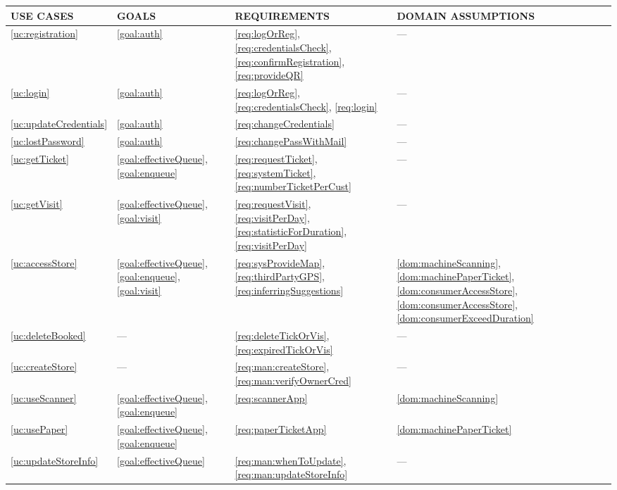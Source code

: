 \documentclass[a4paper, 12pt, oneside]{article}
\begin{document}
\begin{tabularx}{\linewidth}{| p{20mm} | p{20mm} | p{35mm} | p{50mm} |}

     \hline
    USE CASES & GOALS & REQUIREMENTS & DOMAIN ASSUMPTIONS \\
     \hline
    \ref{uc:registration} & \ref{goal:auth} & \ref{req:logOrReg}, \ref{req:credentialsCheck}, \ref{req:confirmRegistration}, \ref{req:provideQR}  & ---\\
    
     \hline
    \ref{uc:login} & \ref{goal:auth} & \ref{req:logOrReg}, \ref{req:credentialsCheck}, \ref{req:login} & --- \\
    
    \hline
    \ref{uc:updateCredentials} & \ref{goal:auth} & \ref{req:changeCredentials} & --- \\

    \hline
    \ref{uc:lostPassword} & \ref{goal:auth} & \ref{req:changePassWithMail} & --- \\
    
    \hline
    \ref{uc:getTicket} & \ref{goal:effectiveQueue}, \ref{goal:enqueue} & \ref{req:requestTicket}, \ref{req:systemTicket}, \ref{req:numberTicketPerCust} & --- \\
    \hline
    
    \ref{uc:getVisit} & \ref{goal:effectiveQueue}, \ref{goal:visit} & \ref{req:requestVisit}, \ref{req:visitPerDay}, \ref{req:statisticForDuration}, \ref{req:visitPerDay} & --- \\
    \hline
    
    \ref{uc:accessStore} & \ref{goal:effectiveQueue}, \ref{goal:enqueue}, \ref{goal:visit} & \ref{req:sysProvideMap}, \ref{req:thirdPartyGPS}, \ref{req:inferringSuggestions} & \ref{dom:machineScanning}, \ref{dom:machinePaperTicket}, \ref{dom:consumerAccessStore}, \ref{dom:consumerAccessStore}, \ref{dom:consumerExceedDuration} \\
    \hline
    
    \ref{uc:deleteBooked} & --- & \ref{req:deleteTickOrVis}, \ref{req:expiredTickOrVis} & --- \\
    \hline
    
    \ref{uc:createStore} & --- & \ref{req:man:createStore}, \ref{req:man:verifyOwnerCred} & --- \\
    \hline
    
    \ref{uc:useScanner} & \ref{goal:effectiveQueue}, \ref{goal:enqueue} & \ref{req:scannerApp} & \ref{dom:machineScanning}\\
    \hline
    
    \ref{uc:usePaper} & \ref{goal:effectiveQueue}, \ref{goal:enqueue} & \ref{req:paperTicketApp} & \ref{dom:machinePaperTicket}\\
    \hline
    
    \ref{uc:updateStoreInfo} & \ref{goal:effectiveQueue} & \ref{req:man:whenToUpdate}, \ref{req:man:updateStoreInfo} & --- \\
    \hline
    
\end{tabularx}
\end{document}
